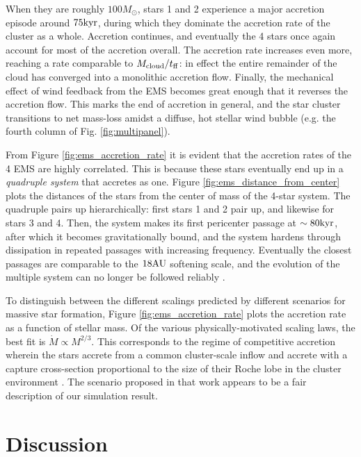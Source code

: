 \documentclass[apjl,twocolumn]{openjournal}
\begin{document}
When they are roughly $100M_\odot$, stars 1 and 2 experience a major accretion episode around $75 \rm kyr$, during which they dominate the accretion rate of the cluster as a whole. Accretion continues, and eventually the 4 stars once again account for most of the accretion overall. The accretion rate increases even more, reaching a rate comparable to $M_{\rm cloud}/t_{\rm ff}$: in effect the entire remainder of the cloud has converged into a monolithic accretion flow. Finally, the mechanical effect of wind feedback from the EMS becomes great enough that it reverses the accretion flow. This marks the end of accretion in general, and the star cluster transitions to net mass-loss amidst a diffuse, hot stellar wind bubble (e.g. the fourth column of Fig. \ref{fig:multipanel}).

From Figure \ref{fig:ems_accretion_rate} it is evident that the accretion rates of the 4 EMS are highly correlated. This is because these stars eventually end up in a {\it quadruple system} that accretes as one. Figure \ref{fig:ems_distance_from_center} plots the distances of the stars from the center of mass of the 4-star system. The quadruple pairs up hierarchically: first stars 1 and 2 pair up, and likewise for stars 3 and 4. Then, the system makes its first pericenter passage at $\sim 80 \rm kyr$, after which it becomes gravitationally bound, and the system hardens through dissipation in repeated passages with increasing frequency. Eventually the closest passages are comparable to the $18 \rm AU$ softening scale, and the evolution of the multiple system can no longer be followed reliably \citep[e.g.][]{guszejnov:2023.starforge.multiplicity}.

To distinguish between the different scalings predicted by different scenarios for massive star formation, Figure \ref{fig:ems_accretion_rate} plots the accretion rate as a function of stellar mass. Of the various physically-motivated scaling laws, the best fit is $\dot{M} \propto M^{2/3}$. This corresponds to the regime of competitive accretion wherein the stars accrete from a common cluster-scale inflow and accrete with a capture cross-section proportional to the size of their Roche lobe in the cluster environment \citep{bonnell:2001.competitive.accretion}. The scenario proposed in that work appears to be a fair description of our simulation result.


\section{Discussion}
\end{document}
